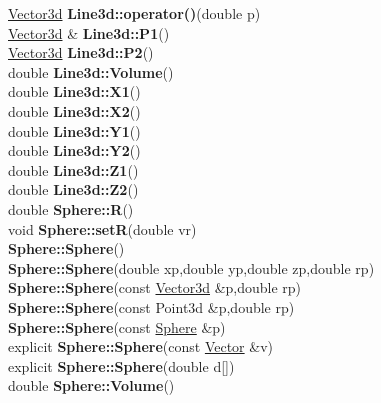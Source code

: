 \documentclass[10pt,titlepage]{article}
\def\functionlistentry#1#2#3#4#5#6{\noindent #1 {\bf #2}(#3) \dotfill #6\\}
\begin{document}
{{\functionlistentry{\hyperlink{Vector3d}{Vector3d}}{Line3d::operator()}{double p}{677}{geoObject3d}{}
\functionlistentry{\hyperlink{Vector3d}{Vector3d} \&}{Line3d::P1}{}{668}{geoObject3d}{}
\functionlistentry{\hyperlink{Vector3d}{Vector3d}}{Line3d::P2}{}{672}{geoObject3d}{}
\functionlistentry{double}{Line3d::Volume}{}{678}{geoObject3d}{}
\functionlistentry{double}{Line3d::X1}{}{665}{geoObject3d}{}
\functionlistentry{double}{Line3d::X2}{}{669}{geoObject3d}{}
\functionlistentry{double}{Line3d::Y1}{}{666}{geoObject3d}{}
\functionlistentry{double}{Line3d::Y2}{}{670}{geoObject3d}{}
\functionlistentry{double}{Line3d::Z1}{}{667}{geoObject3d}{}
\functionlistentry{double}{Line3d::Z2}{}{671}{geoObject3d}{}
\functionlistentry{double}{Sphere::R}{}{656}{geoObject3d}{}
\functionlistentry{void}{Sphere::setR}{double vr}{657}{geoObject3d}{}
\functionlistentry{}{Sphere::Sphere}{}{649}{geoObject3d}{}
\functionlistentry{}{Sphere::Sphere}{double xp,double yp,double zp,double rp}{650}{geoObject3d}{}
\functionlistentry{}{Sphere::Sphere}{const \hyperlink{Vector3d}{Vector3d} \&p,double rp}{651}{geoObject3d}{}
\functionlistentry{}{Sphere::Sphere}{const Point3d \&p,double rp}{652}{geoObject3d}{}
\functionlistentry{}{Sphere::Sphere}{const \hyperlink{Sphere}{Sphere} \&p}{653}{geoObject3d}{}
\functionlistentry{explicit}{Sphere::Sphere}{const \hyperlink{Vector}{Vector} \&v}{654}{geoObject3d}{}
\functionlistentry{explicit}{Sphere::Sphere}{double d[]}{655}{geoObject3d}{}
\functionlistentry{double}{Sphere::Volume}{}{658}{geoObject3d}{}

}}
\end{document}
